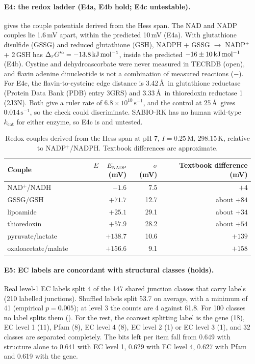 \paragraph{E4: the redox ladder (E4a, E4b hold; E4c untestable).}
 gives the couple potentials derived from the Hess span.
The NAD and NADP couples lie 1.6\,mV apart, within the predicted 10\,mV (E4a).
With glutathione disulfide (GSSG) and reduced glutathione (GSH), NADPH + GSSG $\to$ NADP$^+$ + 2\,GSH has $\Delta_r G'^\circ=-13.8\,\mathrm{kJ\,mol^{-1}}$, inside the predicted $-16\pm10\,\mathrm{kJ\,mol^{-1}}$ (E4b).
Cystine and dehydroascorbate were never measured in TECRDB (\textsf{open}), and flavin adenine dinucleotide is not a combination of measured reactions ($-$).
For E4c, the flavin-to-cysteine edge distance is 3.42\,\AA\ in glutathione reductase (Protein Data Bank (PDB) entry 3GRS) and 3.33\,\AA\ in thioredoxin reductase 1 (2J3N).
Both give a ruler rate of $6.8\times10^{10}\,\mathrm{s^{-1}}$, and the control at 25\,\AA\ gives $0.014\,\mathrm{s^{-1}}$, so the check could discriminate.
SABIO-RK has no human wild-type $k_{\mathrm{cat}}$ for either enzyme, so E4c is  and untested.

\begin{table}[t]
\centering
\caption{Redox couples derived from the Hess span at pH 7, $I=0.25$\,M, 298.15\,K, relative to NADP$^+$/NADPH.
Textbook differences are approximate.}
\label{tab:redox}
\small
\begin{tabular}{@{}lrrr@{}}
\toprule
Couple & $E-E_{\mathrm{NADP}}$ (mV) & $\sigma$ (mV) & Textbook difference (mV) \\
\midrule
NAD$^+$/NADH & $+1.6$ & 7.5 & $+4$ \\
GSSG/GSH & $+71.7$ & 12.7 & about $+84$ \\
lipoamide & $+25.1$ & 29.1 & about $+34$ \\
thioredoxin & $+57.9$ & 28.2 & about $+54$ \\
pyruvate/lactate & $+138.7$ & 10.6 & $+139$ \\
oxaloacetate/malate & $+156.6$ & 9.1 & $+158$ \\
\bottomrule
\end{tabular}
\end{table}

\paragraph{E5: EC labels are concordant with structural classes (holds).}
Real level-1 EC labels split 4 of the 147 shared junction classes that carry labels (210 labelled junctions).
Shuffled labels split 53.7 on average, with a minimum of 41 (empirical $p=0.005$); at level 3 the counts are 4 against 61.8.
For 100 classes no label splits them ().
For the rest, the coarsest splitting label is the gene (18), EC level 1 (11), Pfam (8), EC level 4 (8), EC level 2 (1) or EC level 3 (1), and 32 classes are separated completely.
The bits left per item fall from 0.649 with structure alone to 0.641 with EC level 1, 0.629 with EC level 4, 0.627 with Pfam and 0.619 with the gene.

